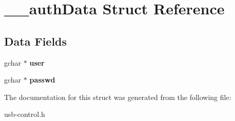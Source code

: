 \hypertarget{struct____authData}{
\section{\_\-\_\-authData Struct Reference}
\label{struct____authData}
}
\subsection*{Data Fields}
\begin{DoxyCompactItemize}
\item 
\hypertarget{struct____authData_ab76c90f2c376f7e9f853d5891282702e}{
gchar $\ast$ {\bfseries user}}
\label{struct____authData_ab76c90f2c376f7e9f853d5891282702e}

\item 
\hypertarget{struct____authData_a6e112fa4cc4254b2b08e0b1f3bd62300}{
gchar $\ast$ {\bfseries passwd}}
\label{struct____authData_a6e112fa4cc4254b2b08e0b1f3bd62300}

\end{DoxyCompactItemize}


The documentation for this struct was generated from the following file:\begin{DoxyCompactItemize}
\item 
usb-\/control.h\end{DoxyCompactItemize}
